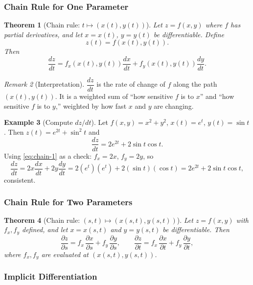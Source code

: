 \documentclass[12pt]{article}
\numberwithin{equation}{section}
\theoremstyle{plain}
\newtheorem{theorem}{Theorem}[section]
\theoremstyle{definition}
\newtheorem{example}[theorem]{Example}
\theoremstyle{remark}
\newtheorem{remark}[theorem]{Remark}
\begin{document}
\subsubsection{Chain Rule for One Parameter}

\begin{theorem}[Chain rule: $t\mapsto (x(t),y(t))$]\label{thm:chain-1}
Let $z=f(x,y)$ where $f$ has partial derivatives, and let $x=x(t)$, $y=y(t)$ be differentiable. Define
\[
z(t)=f(x(t),y(t)).
\]
Then
\begin{equation}\label{eq:chain-1}
\frac{dz}{dt}=f_x(x(t),y(t))\frac{dx}{dt}+f_y(x(t),y(t))\frac{dy}{dt}.
\end{equation}
\end{theorem}

\begin{remark}[Interpretation]
$\dfrac{dz}{dt}$ is the rate of change of $f$ along the path $(x(t),y(t))$.  
It is a weighted sum of “how sensitive $f$ is to $x$” and “how sensitive $f$ is to $y$,” weighted by how fast $x$ and $y$ are changing.
\end{remark}

\begin{example}[Compute $dz/dt$]
Let $f(x,y)=x^2+y^2$, $x(t)=e^t$, $y(t)=\sin t$. Then $z(t)=e^{2t}+\sin^2 t$ and
\[
\frac{dz}{dt}=2e^{2t}+2\sin t\cos t.
\]
Using \cref{eq:chain-1} as a check: $f_x=2x$, $f_y=2y$, so
\[
\frac{dz}{dt}=2x\frac{dx}{dt}+2y\frac{dy}{dt}
=2(e^t)(e^t)+2(\sin t)(\cos t)=2e^{2t}+2\sin t\cos t,
\]
consistent.
\end{example}

\subsubsection{Chain Rule for Two Parameters}

\begin{theorem}[Chain rule: $(s,t)\mapsto (x(s,t),y(s,t))$]\label{thm:chain-2}
Let $z=f(x,y)$ with $f_x,f_y$ defined, and let $x=x(s,t)$ and $y=y(s,t)$ be differentiable. Then
\begin{equation}\label{eq:chain-2}
\frac{\partial z}{\partial s}=f_x\,\frac{\partial x}{\partial s}+f_y\,\frac{\partial y}{\partial s},
\qquad
\frac{\partial z}{\partial t}=f_x\,\frac{\partial x}{\partial t}+f_y\,\frac{\partial y}{\partial t},
\end{equation}
where $f_x,f_y$ are evaluated at $(x(s,t),y(s,t))$.
\end{theorem}

\subsubsection{Implicit Differentiation}
\end{document}
